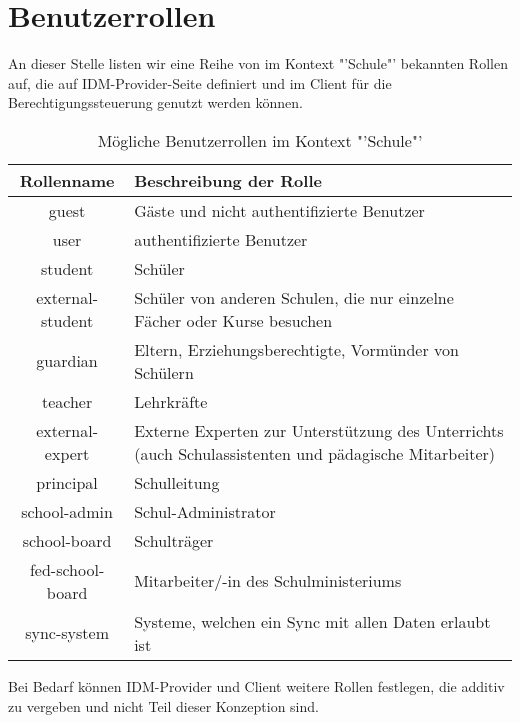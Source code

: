 \section{Benutzerrollen}
\label{Benutzerrollen}
An dieser Stelle listen wir eine Reihe von im Kontext "'Schule"' bekannten Rollen auf, die auf IDM-Provider-Seite definiert und im Client für die Berechtigungssteuerung genutzt werden können.
\\


\begin{table}[htb]
	\begin{tabularx}{\textwidth}{|c|X|}
		\hline
\textbf{Rollenname} & \textbf{Beschreibung der Rolle} \\ \hline
guest & Gäste und nicht authentifizierte Benutzer \\ \hline
user & authentifizierte Benutzer \\ \hline
student & Schüler \\ \hline
external-student & Schüler von anderen Schulen, die nur einzelne Fächer oder Kurse besuchen \\ \hline
guardian & Eltern, Erziehungsberechtigte, Vormünder von Schülern \\ \hline
teacher & Lehrkräfte \\ \hline
external-expert & Externe Experten zur Unterstützung des Unterrichts (auch Schulassistenten und pädagische Mitarbeiter) \\ \hline
principal & Schulleitung \\ \hline
school-admin & Schul-Administrator \\ \hline
school-board & Schulträger \\ \hline
fed-school-board & Mitarbeiter/-in des Schulministeriums \\ \hline
sync-system & Systeme, welchen ein Sync mit allen Daten erlaubt ist \\ \hline

	\end{tabularx}

		\caption{Mögliche Benutzerrollen im Kontext "'Schule"'}
		\label{tab:intro:roles}
\end{table}

Bei Bedarf können IDM-Provider und Client weitere Rollen festlegen, die additiv zu vergeben und nicht Teil dieser Konzeption sind.
